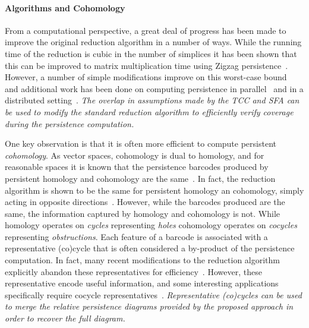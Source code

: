
\paragraph{Algorithms and Cohomology}

From a computational perspective, a great deal of progress has been made to improve the original reduction algorithm in a number of ways.
While the running time of the reduction is cubic in the number of simplices it has been shown that this can be improved to matrix multiplication time using Zigzag persistence~\cite{milosavljevic2011zigzag}.
However, a number of simple modifications improve on this worst-case bound~\cite{chen2011persistent,bauer2014clear} and additional work has been done on computing persistence in parallel~\cite{lewis15parallel} and in a distributed setting~\cite{tahbaz10distributed,bauer2014distributed}.
\emph{The overlap in assumptions made by the TCC and SFA can be used to modify the standard reduction algorithm to efficiently verify coverage during the persistence computation.}

One key observation is that it is often more efficient to compute persistent \emph{cohomology}.
As vector spaces, cohomology is dual to homology, and for reasonable spaces it is known that the persistence barcodes produced by persistent homology and cohomology are the same~\cite{todo}.
In fact, the reduction algorithm is shown to be the same for persistent homology an cohomology, simply acting in opposite directions~\cite{desilva11duality}.
However, while the barcodes produced are the same, the information captured by homology and cohomology is not.
While homology operates on \emph{cycles} representing \emph{holes} cohomology operates on \emph{cocycles} representing \emph{obstructions}.
Each feature of a barcode is associated with a representative (co)cycle that is often considered a by-product of the persistence computation.
In fact, many recent modifications to the reduction algorithm explicitly abandon these representatives for efficiency~\cite{todo}.
However, these representative encode useful information, and some interesting applications specifically require cocycle representatives~\cite{desilva11circular}.
\emph{Representative (co)cycles can be used to merge the relative persistence diagrams provided by the proposed approach in order to recover the full diagram.}
